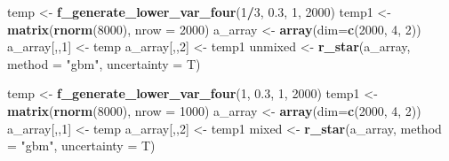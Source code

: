 \documentclass[
]{article}
\newenvironment{Shaded}{\begin{snugshade}}{\end{snugshade}}
\newcommand{\AttributeTok}[1]{\textcolor[rgb]{0.13,0.29,0.53}{#1}}
\newcommand{\DecValTok}[1]{\textcolor[rgb]{0.00,0.00,0.81}{#1}}
\newcommand{\FloatTok}[1]{\textcolor[rgb]{0.00,0.00,0.81}{#1}}
\newcommand{\FunctionTok}[1]{\textcolor[rgb]{0.13,0.29,0.53}{\textbf{#1}}}
\newcommand{\NormalTok}[1]{#1}
\newcommand{\OtherTok}[1]{\textcolor[rgb]{0.56,0.35,0.01}{#1}}
\newcommand{\SpecialCharTok}[1]{\textcolor[rgb]{0.81,0.36,0.00}{\textbf{#1}}}
\newcommand{\StringTok}[1]{\textcolor[rgb]{0.31,0.60,0.02}{#1}}
\begin{document}
\begin{Shaded}
\begin{Highlighting}[]
\NormalTok{temp }\OtherTok{\textless{}{-}} \FunctionTok{f\_generate\_lower\_var\_four}\NormalTok{(}\DecValTok{1}\SpecialCharTok{/}\DecValTok{3}\NormalTok{, }\FloatTok{0.3}\NormalTok{, }\DecValTok{1}\NormalTok{, }\DecValTok{2000}\NormalTok{) }
\NormalTok{temp1 }\OtherTok{\textless{}{-}} \FunctionTok{matrix}\NormalTok{(}\FunctionTok{rnorm}\NormalTok{(}\DecValTok{8000}\NormalTok{), }\AttributeTok{nrow =} \DecValTok{2000}\NormalTok{)}
\NormalTok{a\_array }\OtherTok{\textless{}{-}} \FunctionTok{array}\NormalTok{(}\AttributeTok{dim=}\FunctionTok{c}\NormalTok{(}\DecValTok{2000}\NormalTok{, }\DecValTok{4}\NormalTok{, }\DecValTok{2}\NormalTok{))}
\NormalTok{a\_array[,,}\DecValTok{1}\NormalTok{] }\OtherTok{\textless{}{-}}\NormalTok{ temp}
\NormalTok{a\_array[,,}\DecValTok{2}\NormalTok{] }\OtherTok{\textless{}{-}}\NormalTok{ temp1}
\NormalTok{unmixed }\OtherTok{\textless{}{-}} \FunctionTok{r\_star}\NormalTok{(a\_array, }\AttributeTok{method =} \StringTok{"gbm"}\NormalTok{, }\AttributeTok{uncertainty =}\NormalTok{ T)}

\NormalTok{temp }\OtherTok{\textless{}{-}} \FunctionTok{f\_generate\_lower\_var\_four}\NormalTok{(}\DecValTok{1}\NormalTok{, }\FloatTok{0.3}\NormalTok{, }\DecValTok{1}\NormalTok{, }\DecValTok{2000}\NormalTok{)}
\NormalTok{temp1 }\OtherTok{\textless{}{-}} \FunctionTok{matrix}\NormalTok{(}\FunctionTok{rnorm}\NormalTok{(}\DecValTok{8000}\NormalTok{), }\AttributeTok{nrow =} \DecValTok{1000}\NormalTok{)}
\NormalTok{a\_array }\OtherTok{\textless{}{-}} \FunctionTok{array}\NormalTok{(}\AttributeTok{dim=}\FunctionTok{c}\NormalTok{(}\DecValTok{2000}\NormalTok{, }\DecValTok{4}\NormalTok{, }\DecValTok{2}\NormalTok{))}
\NormalTok{a\_array[,,}\DecValTok{1}\NormalTok{] }\OtherTok{\textless{}{-}}\NormalTok{ temp}
\NormalTok{a\_array[,,}\DecValTok{2}\NormalTok{] }\OtherTok{\textless{}{-}}\NormalTok{ temp1}
\NormalTok{mixed }\OtherTok{\textless{}{-}} \FunctionTok{r\_star}\NormalTok{(a\_array, }\AttributeTok{method =} \StringTok{"gbm"}\NormalTok{, }\AttributeTok{uncertainty =}\NormalTok{ T)}


\end{Highlighting}
\end{Shaded}
\end{document}
